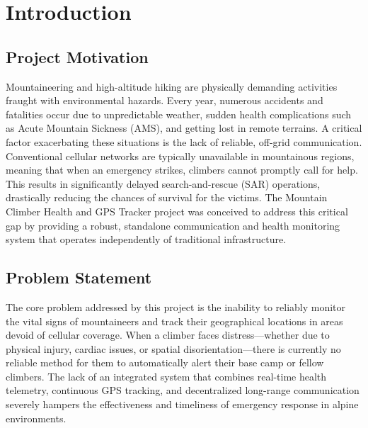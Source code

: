 \chapter{Introduction}
\label{ch:introduction}

\section{Project Motivation}
Mountaineering and high-altitude hiking are physically demanding activities fraught with environmental hazards. Every year, numerous accidents and fatalities occur due to unpredictable weather, sudden health complications such as Acute Mountain Sickness (AMS), and getting lost in remote terrains. A critical factor exacerbating these situations is the lack of reliable, off-grid communication. Conventional cellular networks are typically unavailable in mountainous regions, meaning that when an emergency strikes, climbers cannot promptly call for help. This results in significantly delayed search-and-rescue (SAR) operations, drastically reducing the chances of survival for the victims. The Mountain Climber Health and GPS Tracker project was conceived to address this critical gap by providing a robust, standalone communication and health monitoring system that operates independently of traditional infrastructure.

\section{Problem Statement}
The core problem addressed by this project is the inability to reliably monitor the vital signs of mountaineers and track their geographical locations in areas devoid of cellular coverage. When a climber faces distress—whether due to physical injury, cardiac issues, or spatial disorientation—there is currently no reliable method for them to automatically alert their base camp or fellow climbers. The lack of an integrated system that combines real-time health telemetry, continuous GPS tracking, and decentralized long-range communication severely hampers the effectiveness and timeliness of emergency response in alpine environments.

